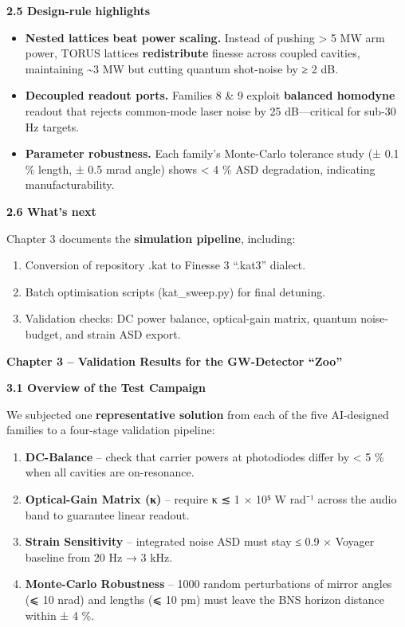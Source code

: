\documentclass[]{article}
\begin{document}
\textbf{2.5 Design-rule highlights}

\begin{itemize}
\item
  \textbf{Nested lattices beat power scaling.} Instead of pushing
  \textgreater{} 5 MW arm power, TORUS lattices \textbf{redistribute}
  finesse across coupled cavities, maintaining \textasciitilde{}3 MW but
  cutting quantum shot-noise by ≥ 2 dB.
\item
  \textbf{Decoupled readout ports.} Families 8 \& 9 exploit
  \textbf{balanced homodyne} readout that rejects common-mode laser
  noise by 25 dB---critical for sub-30 Hz targets.
\item
  \textbf{Parameter robustness.} Each family's Monte-Carlo tolerance
  study (± 0.1 \% length, ± 0.5 mrad angle) shows \textless{} 4 \% ASD
  degradation, indicating manufacturability.
\end{itemize}

\textbf{2.6 What's next}

Chapter 3 documents the \textbf{simulation pipeline}, including:

\begin{enumerate}
\def\labelenumi{\arabic{enumi}.}
\item
  Conversion of repository .kat to Finesse 3 ``.kat3'' dialect.
\item
  Batch optimisation scripts (kat\_sweep.py) for final detuning.
\item
  Validation checks: DC power balance, optical-gain matrix, quantum
  noise-budget, and strain ASD export.
\end{enumerate}

\textbf{Chapter 3 -- Validation Results for the GW-Detector ``Zoo''}

\textbf{3.1 Overview of the Test Campaign}

We subjected one \textbf{representative solution} from each of the five
AI-designed families to a four-stage validation pipeline:

\begin{enumerate}
\def\labelenumi{\arabic{enumi}.}
\item
  \textbf{DC-Balance} -- check that carrier powers at photodiodes differ
  by \textless{} 5 \% when all cavities are on-resonance.
\item
  \textbf{Optical-Gain Matrix (κ)} -- require κ ≲ 1 × 10⁵ W rad⁻¹ across
  the audio band to guarantee linear readout.
\item
  \textbf{Strain Sensitivity} -- integrated noise ASD must stay ≤ 0.9 ×
  Voyager baseline from 20 Hz → 3 kHz.
\item
  \textbf{Monte-Carlo Robustness} -- 1000 random perturbations of mirror
  angles (⩽ 10 nrad) and lengths (⩽ 10 pm) must leave the BNS horizon
  distance within ± 4 \%.
\end{enumerate}
\end{document}
